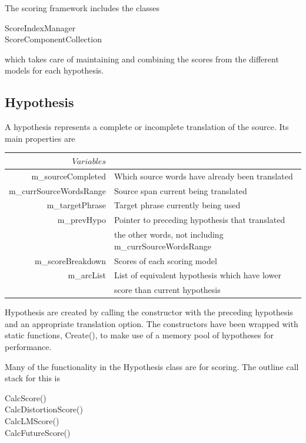 \documentclass[11pt]{report}
\theoremstyle{plain}
\begin{document}
{The scoring framework includes the classes \\
\begin{tt}
\indent ScoreIndexManager\\
\indent	ScoreComponentCollection
\end{tt}

which takes care of maintaining and combining the scores from the different models for each hypothesis.

\subsection{Hypothesis}
A hypothesis represents a complete or incomplete translation of the source. Its main properties are

\begin{center}
\begin{tabular}{|r|l|}
\hline
$ Variables $&$ $\\
\hline
m\_sourceCompleted & Which source words have already been translated\\
m\_currSourceWordsRange & Source span current being translated\\
m\_targetPhrase & Target phrase currently being used\\
m\_prevHypo & Pointer to preceding hypothesis that translated \\
 & the other words, not including m\_currSourceWordsRange\\
m\_scoreBreakdown & Scores of each scoring model\\
m\_arcList & List of equivalent hypothesis which have lower\\
 & score than current hypothesis\\
\hline
\end{tabular}
\end{center}

Hypothesis are created by calling the constructor with the preceding hypothesis and an appropriate translation option. The constructors have been wrapped with static functions, Create(), to make use of a memory pool of hypotheses for performance.

Many of the functionality in the Hypothesis class are for scoring. The outline call stack for this is\\
\begin{tt}
\indent CalcScore()\\
\indent	\indent	CalcDistortionScore()\\
\indent	\indent	CalcLMScore()\\
\indent	\indent	CalcFutureScore()\\
\end{tt}

}
\end{document}
